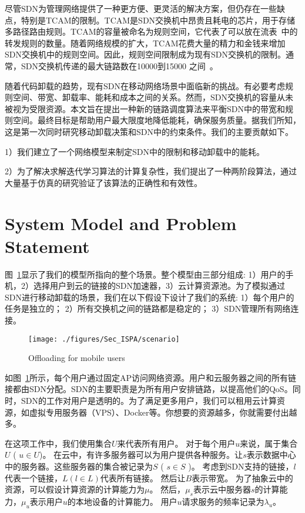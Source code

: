 尽管SDN为管理网络提供了一种更方便、更灵活的解决方案，但仍存在一些缺点，特别是TCAM的限制。TCAM是SDN交换机中昂贵且耗电的芯片，用于存储多路径路由规则。TCAM的容量被命名为规则空间，它代表了可以放在流表~\cite{Dasgupta:2012:DMD:2400771.2401550}中的转发规则的数量。随着网络规模的扩大，TCAM花费大量的精力和金钱来增加SDN交换机中的规则空间。因此，规则空间限制成为现有SDN交换机的限制。通常，SDN交换机传递的最大链路数在10000到15000 之间~\cite{Katta:2014es}。

随着代码卸载的趋势，现有SDN在移动网络场景中面临新的挑战。有必要考虑规则空间、带宽、卸载率、能耗和成本之间的关系。然而，SDN交换机的容量从未被视为受限资源。本文旨在提出一种新的链路调度算法来平衡SDN中的带宽和规则空间。最终目标是帮助用户最大限度地降低能耗，确保服务质量。据我们所知，这是第一次同时研究移动卸载决策和SDN中的约束条件。我们的主要贡献如下。

1）我们建立了一个网络模型来制定SDN中的限制和移动卸载中的能耗。

2）为了解决求解迭代学习算法的计算复杂性，我们提出了一种两阶段算法，通过大量基于仿真的研究验证了该算法的正确性和有效性。

\section{System Model and Problem Statement}

图~\ref{fig_scenario}显示了我们的模型所指向的整个场景。整个模型由三部分组成: 1）用户的手机，2）选择用户到云的链接的SDN加速器，3）云计算资源池。为了模拟通过SDN进行移动卸载的场景，我们在以下假设下设计了我们的系统: 
1）每个用户的任务是独立的；
2）所有交换机之间的链路都是稳定的；
3）SDN管理所有网络连接。

\begin{figure}[!h]
  \vspace{-2em}
  \centering
  \texttt{[image: ./figures/Sec\_ISPA/scenario]}
  \vspace{-1em}
  \caption{Offloading for mobile users}
  \label{fig_scenario}
\end{figure}

如图~\ref{fig_scenario}所示，每个用户通过固定AP访问网络资源。用户和云服务器之间的所有链接都由SDN分配。SDN的主要职责是为所有用户安排链路，以提高他们的QoS。同时，SDN的工作对用户是透明的。为了满足更多用户，我们可以租用云计算资源，如虚拟专用服务器（VPS）、Docker等。你想要的资源越多，你就需要付出越多。

在这项工作中，我们使用集合$U$来代表所有用户。 对于每个用户$u$来说，属于集合$U$ ( $ u \in U $)。 在云中，有许多服务器可以为用户提供各种服务。让$s$表示数据中心中的服务器。这些服务器的集合被记录为$S$ ( $ s \in S $ )。 考虑到SDN支持的链接，$l$代表一个链接，$ L ( l \in L ) $代表所有链接。 然后让$B$表示带宽。 为了抽象云中的资源，可以假设计算资源的计算能力为$\mu$。 然后，$\mu_s$表示云中服务器$s$的计算能力，$\mu_u$表示用户$u$的本地设备的计算能力。 用户$u$请求服务的频率记录为$ \lambda_u $。

